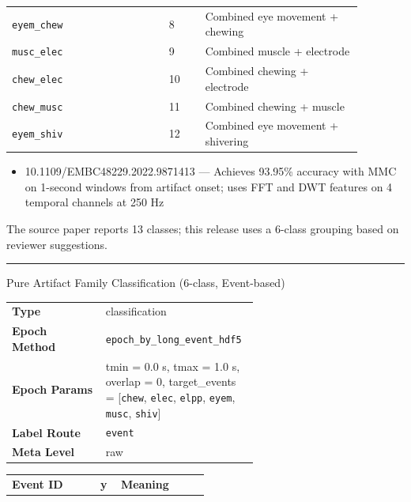 {\begin{tcolorbox}
\begin{tabular}{@{}p{0.3911\linewidth}p{0.0978\linewidth}p{0.3911\linewidth}@{}}
\texttt{eyem\_chew} & 8 & Combined eye movement + chewing \\
\texttt{musc\_elec} & 9 & Combined muscle + electrode \\
\texttt{chew\_elec} & 10 & Combined chewing + electrode \\
\texttt{chew\_musc} & 11 & Combined chewing + muscle \\
\texttt{eyem\_shiv} & 12 & Combined eye movement + shivering \\
\bottomrule
\end{tabular}
\endgroup
\par{}\par
\begin{itemize}[leftmargin=1.3em,noitemsep,topsep=1pt]
\item[\scriptsize$\cdot$] {\scriptsize 10.1109/EMBC48229.2022.9871413 --- Achieves 93.95\% accuracy with MMC on 1-second windows from artifact onset; uses FFT and DWT features on 4 temporal channels at 250 Hz}
\end{itemize}
\par{} {\footnotesize The source paper reports 13 classes; this release uses a 6-class grouping based on reviewer suggestions.}
\noindent\rule{\linewidth}{0.4pt}\par\nopagebreak
{} {\footnotesize Pure Artifact Family Classification (6-class, Event-based)}\par\smallskip
{\footnotesize\begin{tabular}{@{}lp{0.62\linewidth}@{}}
\textbf{Type} & classification \\
\textbf{Epoch Method} & \texttt{epoch\_by\_long\_event\_hdf5} \\
\textbf{Epoch Params} & tmin = 0.0 s, tmax = 1.0 s, overlap = 0, target\_events = [\texttt{chew}, \texttt{elec}, \texttt{elpp}, \texttt{eyem}, \texttt{musc}, \texttt{shiv}] \\
\textbf{Label Route} & \texttt{event} \\
\textbf{Meta Level} & raw \\
\end{tabular}}
\par{}\par\smallskip
\begingroup\footnotesize
\begin{tabular}{@{}p{0.3911\linewidth}p{0.0978\linewidth}p{0.3911\linewidth}@{}}
\toprule
\textbf{Event ID} & \textbf{y} & \textbf{Meaning} \\

\end{tabular}
\end{tcolorbox}}
